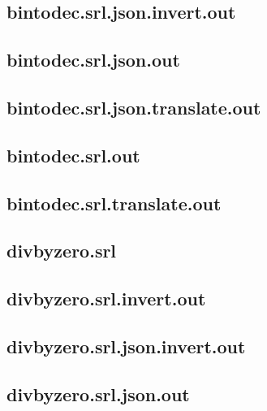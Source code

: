 \subsection{bintodec.srl.json.invert.out}
\label{app:bintodec_srl.json.invert.out}

\subsection{bintodec.srl.json.out}
\label{app:bintodec_srl.json.out}

\subsection{bintodec.srl.json.translate.out}
\label{app:bintodec_srl.json.translate.out}

\subsection{bintodec.srl.out}
\label{app:bintodec_srl.out}

\subsection{bintodec.srl.translate.out}
\label{app:bintodec_srl.translate.out}

\subsection{divbyzero.srl}
\label{app:divbyzero_srl}

\subsection{divbyzero.srl.invert.out}
\label{app:divbyzero_srl.invert.out}

\subsection{divbyzero.srl.json.invert.out}
\label{app:divbyzero_srl.json.invert.out}

\subsection{divbyzero.srl.json.out}
\label{app:divbyzero_srl.json.out}

